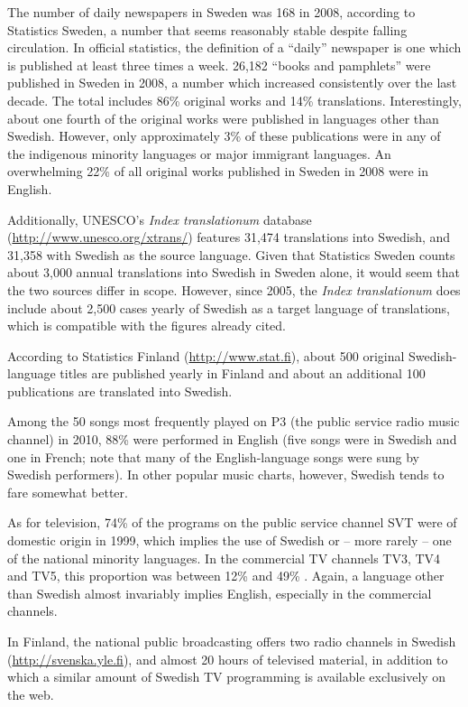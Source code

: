 \begin{multicols}{2}
The number of daily newspapers in Sweden was 168 in 2008, according to
Statistics Sweden, a number that seems reasonably stable despite
falling circulation. In official statistics, the definition of a
``daily'' newspaper is one which is published at least three times a
week. 26,182 ``books and pamphlets'' were published in Sweden in 2008,
a number which increased consistently over the last decade. The total
includes 86\% original works and 14\% translations. Interestingly,
about one fourth of the original works were published in languages
other than Swedish. However, only approximately 3\% of these
publications were in any of the indigenous minority languages or major
immigrant languages. An overwhelming 22\% of all original works
published in Sweden in 2008 were in English.

Additionally, UNESCO’s \textit{Index translationum}
data\-base (\url{http://www.unesco.org/xtrans/}) features 31,474
translations into Swedish, and 31,358 with Swedish as the source
language. Given that Statistics Sweden counts about 3,000 annual
translations into Swedish in Sweden alone, it would seem that the two
sources differ in scope. However, since 2005, the \textit{Index
  translationum} does include about 2,500 cases yearly of Swedish as a
target language of translations, which is compatible with the figures
already cited.

According to Statistics Finland (\url{http://www.stat.fi}), about
500 original Swedish-language titles are published yearly in Finland
and about an additional 100 publications are translated into Swedish.

Among the 50 songs most frequently played on P3 (the public service
radio music channel\cite{p3})
in 2010, 88\% were performed in English (five songs were in Swedish
and one in French; note that many of the English-language songs were
sung by Swedish performers). In other popular music charts, however,
Swedish tends to fare somewhat better.

As for television, 74\% of the programs on the public service channel
SVT were of domestic origin in 1999, which implies the use of Swedish
or -- more rarely -- one of the national minority languages. In the
commercial TV channels TV3, TV4 and TV5, this proportion was between
12\% and 49\% \cite[79]{falk2001}. Again, a language other than Swedish
almost invariably implies English, especially in the commercial
channels.

In Finland, the national public broadcasting offers two radio channels
in Swedish (\url{http://svenska.yle.fi}), and almost 20 hours of televised material, in addition to
which a similar amount of Swedish TV programming is available
exclusively on the web.


\end{multicols}
